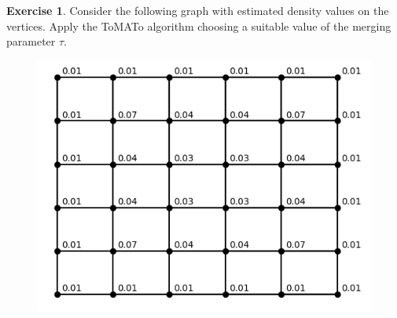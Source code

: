 \documentclass{article}
\theoremstyle{plain}
\theoremstyle{definition}
\newtheorem{exercise}{Exercise}
\begin{document}
\begin{exercise}
Consider the following graph with estimated density values on the vertices. Apply the ToMATo algorithm choosing a suitable value of the merging parameter $\tau$. 
\begin{figure}[h!]
\centering
\includegraphics[scale=0.6]{graphexercise}
\end{figure}
\end{exercise}
%
\end{document}
